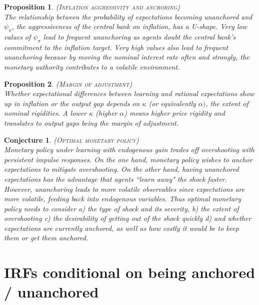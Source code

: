 \documentclass[11pt]{article}
\renewcommand{\[}{\begin{equation}}
\renewcommand{\]}{\end{equation}}
\newtheorem{prop}{Proposition}
\newtheorem{conjecture}{Conjecture}
\begin{document}
	\begin{prop}\textsc{(Inflation aggressivity and anchoring)} \\
	The relationship between the probability of expectations becoming unanchored and $\psi_{\pi}$, the aggressiveness of the central bank on inflation, has a U-shape. Very low values of $\psi_{\pi}$ lead to frequent unanchoring as agents doubt the central bank's commitment to the inflation target. Very high values also lead to frequent unanchoring because by moving the nominal interest rate often and strongly, the monetary authority contributes to a volatile environment. 
	\end{prop}
	
	\begin{prop} \textsc{(Margin of adjustment)} \\
	Whether expectational differences between learning and rational expectations show up in inflation or the output gap depends on $\kappa$ (or equivalently $\alpha)$, the extent of nominal rigidities. A lower $\kappa$ (higher $\alpha$) means higher price rigidity and translates to output gaps being the margin of adjustment. 
	\end{prop}
	
	\begin{conjecture} \textsc{(Optimal monetary policy)} \\
	Monetary policy under learning with endogenous gain trades off overshooting with persistent impulse responses. On the one hand, monetary policy wishes to anchor expectations to mitigate overshooting. On the other hand, having unanchored expectations has the advantage that agents ``learn away" the shock faster. However, unanchoring leads to more volatile observables since expectations are more volatile, feeding back into endogenous variables. Thus optimal monetary policy needs to consider a) the type of shock and its severity, b) the extent of overshooting c) the desirability of getting out of the shock quickly d) and whether expectations are currently anchored, as well as how costly it would be to keep them or get them anchored. 
	\end{conjecture}


\section{IRFs conditional on being anchored / unanchored}
\end{document}
